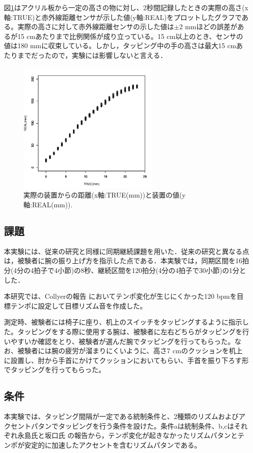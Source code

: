 \documentclass[twocolumn,10pt]{jarticle}
\begin{document}
図\ref{distance_true}はアクリル板から一定の高さの物に対し、2秒間記録したときの実際の高さ(x軸:TRUE)と赤外線距離センサが示した値(y軸:REAL)をプロットしたグラフである。実際の高さに対して赤外線距離センサの示した値は$\pm{2}$ mmほどの誤差があるが15 cmあたりまで比例関係が成り立っている。15 cm以上のとき、センサの値は180 mmに収束している。しかし，タッピング中の手の高さは最大15 cmあたりまでだったので，実験には影響しないと言える．

\begin{figure}
  \centering
  \includegraphics[width=7cm]{distance_true.jpg}
  \caption{実際の装置からの距離(x軸:TRUE(mm))と装置の値(y軸:REAL(mm)).}
  \label{distance_true}
\end{figure}

\subsection{課題}
本実験には、従来の研究と同様に同期継続課題を用いた．従来の研究と異なる点は，被験者に腕の振り上げ方を指示した点である．本実験では，同期区間を16拍分(4分の4拍子で4小節)の8秒、継続区間を120拍分(4分の4拍子で30小節)の1分とした．

本研究では、Collyerの報告 \cite{Collyer}においてテンポ変化が生じにくかった120 bpmを目標テンポに設定して目標リズム音を作成した。

測定時、被験者には椅子に座り、机上のスイッチをタッピングするように指示した。タッピングをする際に使用する腕は、被験者に左右どちらがタッピングを行いやすいか確認をとり、被験者が選んだ腕でタッピングを行ってもらった。なお、被験者には腕の疲労が溜まりにくいように、高さ7 cmのクッションを机上に設置し、肘から手首にかけてクッションにおいてもらい、手首を振り下ろす形でタッピングを行ってもらった。

\subsection{条件}
本実験では、タッピング間隔が一定である統制条件と、2種類のリズムおよびアクセントパタンでタッピングを行う条件を設けた。条件aは統制条件、b,cはそれぞれ永島氏と坂口氏 \cite{Nagasima}の報告から，テンポ変化が起きなかったリズムパタンとテンポが安定的に加速したアクセントを含むリズムパタンである。
\end{document}
